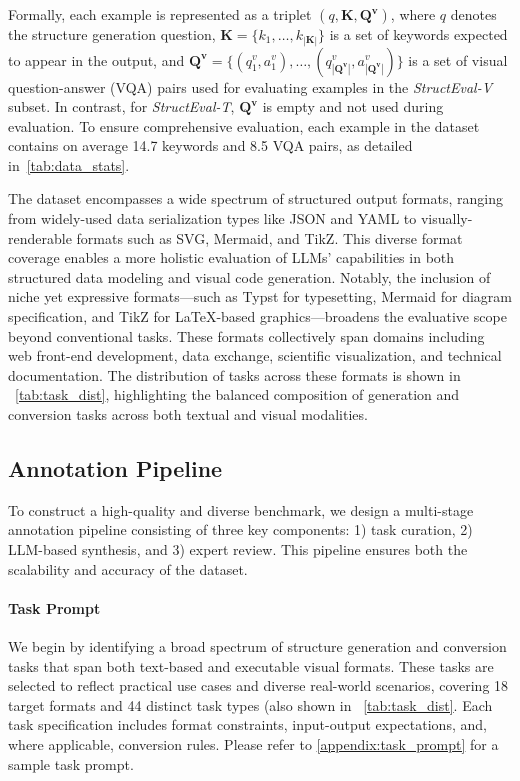 


Formally, each example is represented as a triplet $(q, \mathbf{K}, \mathbf{Q^v})$, where $q$ denotes the structure generation question, $\mathbf{K} = \{k_1, \dots, k_{|\mathbf{K}|}\}$ is a set of keywords expected to appear in the output, and $\mathbf{Q^v} = \{(q^v_1, a^v_1), \dots, (q^v_{|\mathbf{Q^v}|}, a^v_{|\mathbf{Q^v}|})\}$ is a set of visual question-answer (VQA) pairs used for evaluating examples in the \emph{StructEval-V} subset. In contrast, for \emph{StructEval-T}, $\mathbf{Q^v}$ is empty and not used during evaluation. To ensure comprehensive evaluation, each example in the dataset contains on average 14.7 keywords and 8.5 VQA pairs, as detailed in~\autoref{tab:data_stats}.


The dataset encompasses a wide spectrum of structured output formats, ranging from widely-used data serialization types like JSON and YAML to visually-renderable formats such as SVG, Mermaid, and TikZ. This diverse format coverage enables a more holistic evaluation of LLMs’ capabilities in both structured data modeling and visual code generation. Notably, the inclusion of niche yet expressive formats—such as Typst for typesetting, Mermaid for diagram specification, and TikZ for LaTeX-based graphics—broadens the evaluative scope beyond conventional tasks. These formats collectively span domains including web front-end development, data exchange, scientific visualization, and technical documentation. The distribution of tasks across these formats is shown in ~\autoref{tab:task_dist}, highlighting the balanced composition of generation and conversion tasks across both textual and visual modalities.





\subsection{Annotation Pipeline}
\label{subsec:annotation_pipeline}

To construct a high-quality and diverse benchmark, we design a multi-stage annotation pipeline consisting of three key components: 1) task curation, 2) LLM-based synthesis, and 3) expert review. This pipeline ensures both the scalability and accuracy of the \structeval dataset.

\paragraph{Task Prompt}  
We begin by identifying a broad spectrum of structure generation and conversion tasks that span both text-based and executable visual formats. These tasks are selected to reflect practical use cases and diverse real-world scenarios, covering 18 target formats and 44 distinct task types (also shown in ~\autoref{tab:task_dist}. Each task specification includes format constraints, input-output expectations, and, where applicable, conversion rules. Please refer to \autoref{appendix:task_prompt} for a sample task prompt. 


